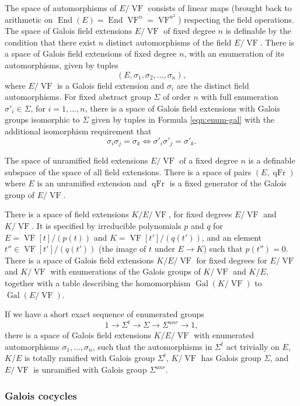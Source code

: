 \documentclass[12pt]{amsart}
\newcommand{\op}[1]{\operatorname{#1}}
\def\VF{{\op{VF}}}
\theoremstyle{plain}
\theoremstyle{definition}
\begin{document}
The space of automorphisms of $E/\VF$ consists of linear maps (brought
back to arithmetic on $\op{End}(E) = \op{End}{\VF^n} = \VF^{n^2}$)
respecting the field operations.  The space of Galois field extensions
$E/\VF$ of fixed degree $n$ is definable by the condition that there
exist $n$ distinct automorphisms of the field $E/\VF$.  There is a
space of Galois field extensions of fixed degree $n$, with an
enumeration of its automorphisms, given by tuples
\begin{equation}\label{eqn:enum-gal}
(E,\sigma_1,\sigma_2,\ldots,\sigma_n),
\end{equation}
where $E/\VF$ is a Galois field extension and $\sigma_i$ are the
distinct field automorphisms.  For fixed abstract group $\Sigma$ of
order $n$ with full enumeration $\sigma'_i\in \Sigma$, for
$i=1,\ldots,n$, there is a space of Galois field extensions with
Galois groups isomorphic to $\Sigma$ given by tuples in Formula
\ref{eqn:enum-gal} with the additional isomorphism requirement that
\[
\sigma_i\sigma_j = \sigma_k \Longleftrightarrow \sigma'_i\sigma'_j =
\sigma'_k.
\]

The space of unramified field extensions $E/\VF$ of a fixed degree $n$
is a definable subspace of the space of all field extensions.  There
is a space of pairs $(E,\op{qFr})$ where $E$ is an unramified extension
and $\op{qFr}$ is a fixed generator of the Galois group of $E/\VF$.  

There is a space of field extensions $K/E/\VF$, for fixed degrees
$E/\VF$ and $K/\VF$.  It is specified by irreducible polynomials
$p$ and $q$ for $E = \VF[t]/(p(t))$ and $K = \VF[t']/(q(t'))$, and an
element $t''\in \VF[t']/(q(t'))$ (the image of $t$ under $E\to K$) such
that $p(t'') = 0$.  There is a space of Galois field extensions
$K/E/\VF$ for fixed degrees for $E/\VF$ and $K/\VF$ with enumerations
of the Galois groups of $K/\VF$ and $K/E$, together with a table
describing the homomorphism $\op{Gal}(K/\VF)$ to $\op{Gal}(E/\VF)$.

If we have a short exact sequence of enumerated groups 
\[
1 \to \Sigma^t \to \Sigma \to \Sigma^{unr}\to 1,
\]
there is a space of Galois field extensions $K/E/\VF$ with enumerated
automorphisms $\sigma_1,\ldots,\sigma_n$, such that the automorphisms in
$\Sigma^t$ act trivially on $E$, $K/E$ is totally ramified with Galois
group $\Sigma^t$, $K/\VF$ has Galois group $\Sigma$, and $E/\VF$ is
unramified with Galois group $\Sigma^{unr}$.

\subsubsection{Galois cocycles}
\end{document}

